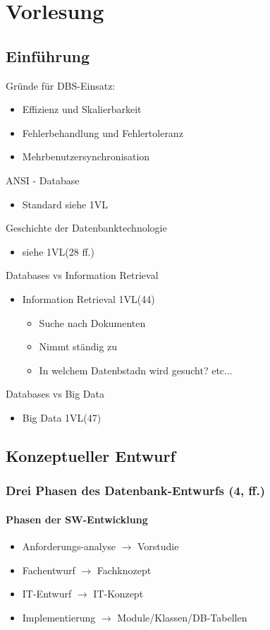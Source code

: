 
\chapter{Vorlesung}
\section{Einführung}

Gründe für DBS-Einsatz:
\begin{itemize}
\item Effizienz und Skalierbarkeit
\item Fehlerbehandlung und Fehlertoleranz
\item Mehrbenutzersynchronisation
\end{itemize}

ANSI - Database
\begin{itemize}
\item Standard siehe 1VL
\end{itemize}

Geschichte der Datenbanktechnologie
\begin{itemize}
\item siehe 1VL(28 ff.)
\end{itemize}


Databases vs Information Retrieval
\begin{itemize}
\item Information Retrieval 1VL(44)
\begin{itemize}
\item Suche nach Dokumenten
\item Nimmt ständig zu
\item In welchem Datenbstadn wird gesucht? etc...
\end{itemize}
\end{itemize}

Databases vs Big Data
\begin{itemize}
\item Big Data 1VL(47)
\end{itemize}

\section{Konzeptueller Entwurf}
\subsection{Drei Phasen des Datenbank-Entwurfs (4, ff.)}
\subsubsection{Phasen der SW-Entwicklung}
\begin{itemize}
	\item Anforderungs-analyse \(\to\) Vorstudie
	\item Fachentwurf \(\to\) Fachknozept
	\item IT-Entwurf \(\to\) IT-Konzept
	\item Implementierung \(\to\) Module/Klassen/DB-Tabellen
\end{itemize}
